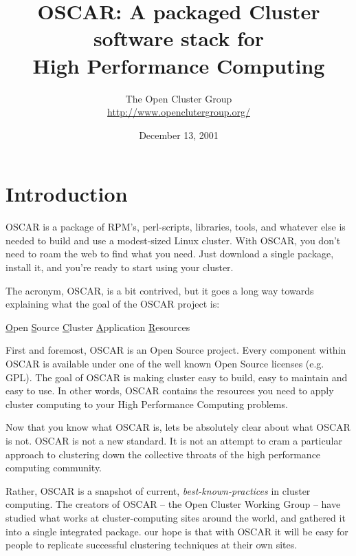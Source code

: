 \documentclass[letterpaper,11pt]{article}
\begin{document}
\title{OSCAR: A packaged Cluster software stack for \\
       High Performance Computing} 
\author{The Open Cluster Group \\
\url{http://www.openclutergroup.org/}}

\date{December 13, 2001}

\maketitle



\section{Introduction}
OSCAR is a package of RPM's, perl-scripts, libraries, tools, and
whatever else is needed to build and use a modest-sized Linux cluster.
With OSCAR, you don't need to roam the web to find what you need.
Just download a single package, install it, and you're ready to start
using your cluster.

The acronym, OSCAR, is a bit contrived, but it goes a long way towards
explaining what the goal of the OSCAR project is: 
\begin{center}
 \underline{O}pen \underline{S}ource \underline{C}luster 
 \underline{A}pplication \underline{R}esources
\end{center}

First and foremost, OSCAR is an Open Source project.  Every component
within OSCAR is available under one of the well known Open Source
licenses (e.g. GPL).  The goal of OSCAR is making cluster easy to
build, easy to maintain and easy to use.  In other words, OSCAR
contains the resources you need to apply cluster computing to your
High Performance Computing problems.

Now that you know what OSCAR is, lets be absolutely clear about what
OSCAR is not.  OSCAR is not a new standard.  It is not an attempt to
cram a particular approach to clustering down the collective throats
of the high performance computing community.

Rather, OSCAR is a snapshot of current, \emph{best-known-practices} in
cluster computing.  The creators of OSCAR -- the Open Cluster Working
Group -- have studied what works at cluster-computing sites around the
world, and gathered it into a single integrated package.  our hope is
that with OSCAR it will be easy for people to replicate successful
clustering techniques at their own sites.
\end{document}
